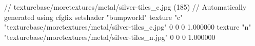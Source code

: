 // texturebase/moretextures/metal/silver-tiles_c.jpg (185)
// Automatically generated using cfgfix
setshader "bumpworld"
texture "c" "texturebase/moretextures/metal/silver-tiles_c.jpg" 0 0 0 1.000000
texture "n" "texturebase/moretextures/metal/silver-tiles_n.jpg" 0 0 0 1.000000
